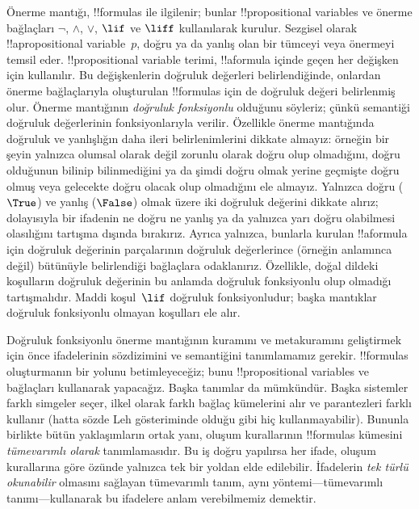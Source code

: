 



Önerme mantığı, !!{formula}s ile ilgilenir; bunlar !!{propositional variable}s
ve önerme bağlaçları $\lnot$, $\land$, $\lor$, $\lif$ ve $\liff$
kullanılarak kurulur. Sezgisel olarak !!a{propositional variable}~$p$, doğru
ya da yanlış olan bir tümceyi veya önermeyi temsil eder.
!!{propositional variable} terimi, !!a{formula} içinde geçen her değişken
için kullanılır. Bu değişkenlerin doğruluk değerleri belirlendiğinde,
onlardan önerme bağlaçlarıyla oluşturulan !!{formula}s için de doğruluk
değeri belirlenmiş olur. Önerme mantığının \emph{doğruluk
  fonksiyonlu} olduğunu söyleriz; çünkü semantiği doğruluk değerlerinin
fonksiyonlarıyla verilir. Özellikle önerme mantığında doğruluk ve yanlışlığın
daha ileri belirlenimlerini dikkate almayız: örneğin bir şeyin yalnızca
olumsal olarak değil zorunlu olarak doğru olup olmadığını, doğru olduğunun
bilinip bilinmediğini ya da şimdi doğru olmak yerine geçmişte doğru olmuş
veya gelecekte doğru olacak olup olmadığını ele almayız. Yalnızca doğru
($\True$) ve yanlış ($\False$) olmak üzere iki doğruluk değerini dikkate
alırız; dolayısıyla bir ifadenin ne doğru ne yanlış ya da yalnızca yarı doğru
olabilmesi olasılığını tartışma dışında bırakırız. Ayrıca yalnızca, bunlarla
kurulan !!a{formula} için doğruluk değerinin parçalarının doğruluk değerlerince
(örneğin anlamınca değil) bütünüyle belirlendiği bağlaçlara odaklanırız.
Özellikle, doğal dildeki koşulların doğruluk değerinin bu anlamda doğruluk
fonksiyonlu olup olmadığı tartışmalıdır. Maddi koşul~$\lif$ doğruluk
fonksiyonludur; başka mantıklar doğruluk fonksiyonlu olmayan koşulları ele
alır.

Doğruluk fonksiyonlu önerme mantığının kuramını ve metakuramını geliştirmek
için önce ifadelerinin sözdizimini ve semantiğini tanımlamamız gerekir.
!!{formula}s oluşturmanın bir yolunu betimleyeceğiz; bunu
!!{propositional variable}s ve bağlaçları kullanarak yapacağız. Başka tanımlar da mümkündür. Başka
sistemler farklı simgeler seçer, ilkel olarak farklı bağlaç kümelerini alır ve
parantezleri farklı kullanır (hatta sözde Leh gösteriminde olduğu gibi hiç
kullanmayabilir). Bununla birlikte bütün yaklaşımların ortak yanı, oluşum
kurallarının !!{formula}s kümesini \emph{tümevarımlı olarak} tanımlamasıdır.
Bu iş doğru yapılırsa her ifade, oluşum kurallarına göre özünde yalnızca tek
bir yoldan elde edilebilir. İfadelerin \emph{tek türlü okunabilir} olmasını
sağlayan tümevarımlı tanım, aynı yöntemi---tümevarımlı tanımı---kullanarak bu
ifadelere anlam verebilmemiz demektir.

